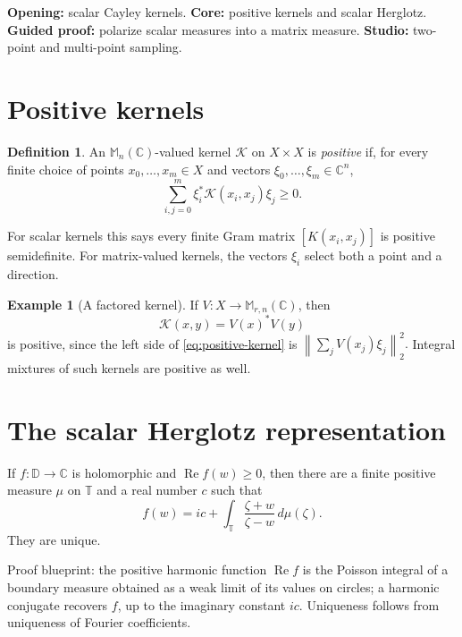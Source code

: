 \documentclass[11pt,oneside,openany]{book}
\theoremstyle{definition}
\newtheorem{definition}[theorem]{Definition}
\newtheorem{example}[theorem]{Example}
\theoremstyle{remark}
\newcommand{\C}{\mathbb C}
\newcommand{\D}{\mathbb D}
\newcommand{\Torus}{\mathbb T}
\newcommand{\Mn}{\mathbb M_n(\C)}
\newcommand{\RePart}{\operatorname{Re}}
\newcommand{\norm}[1]{\left\lVert #1\right\rVert}
\begin{document}
\begin{workshopplan}
\textbf{Opening:} scalar Cayley kernels.
\textbf{Core:} positive kernels and scalar Herglotz.
\textbf{Guided proof:} polarize scalar measures into a matrix measure.
\textbf{Studio:} two-point and multi-point sampling.
\end{workshopplan}

\section{Positive kernels}

\begin{definition}
An \(\Mn\)-valued kernel \(\mathcal K\) on \(X\times X\) is
\emph{positive} if, for every finite choice of points
\(x_0,\ldots,x_m\in X\) and vectors
\(\xi_0,\ldots,\xi_m\in\C^n\),
\begin{equation}
  \sum_{i,j=0}^m
  \xi_i^*\mathcal K(x_i,x_j)\xi_j\geq0.
  \label{eq:positive-kernel}
\end{equation}
\end{definition}

For scalar kernels this says every finite Gram matrix
\([K(x_i,x_j)]\) is positive semidefinite.  For matrix-valued kernels,
the vectors \(\xi_i\) select both a point and a direction.

\begin{example}[A factored kernel]
If \(V:X\to\mathbb M_{r,n}(\C)\), then
\[
  \mathcal K(x,y)=V(x)^*V(y)
\]
is positive, since the left side of \eqref{eq:positive-kernel} is
\(
\norm{\sum_jV(x_j)\xi_j}_2^2.
\)
Integral mixtures of such kernels are positive as well.
\end{example}

\section{The scalar Herglotz representation}

\begin{blackbox}
If \(f:\D\to\C\) is holomorphic and \(\RePart f(w)\geq0\), then there
are a finite positive measure \(\mu\) on \(\Torus\) and a real number
\(c\) such that
\begin{equation}
  f(w)=ic+\int_{\Torus}\frac{\zeta+w}{\zeta-w}\,d\mu(\zeta).
  \label{eq:scalar-herglotz}
\end{equation}
They are unique.

Proof blueprint: the positive harmonic function \(\RePart f\) is the
Poisson integral of a boundary measure obtained as a weak limit of its
values on circles; a harmonic conjugate recovers \(f\), up to the
imaginary constant \(ic\).  Uniqueness follows from uniqueness of
Fourier coefficients.
\end{blackbox}
\end{document}
